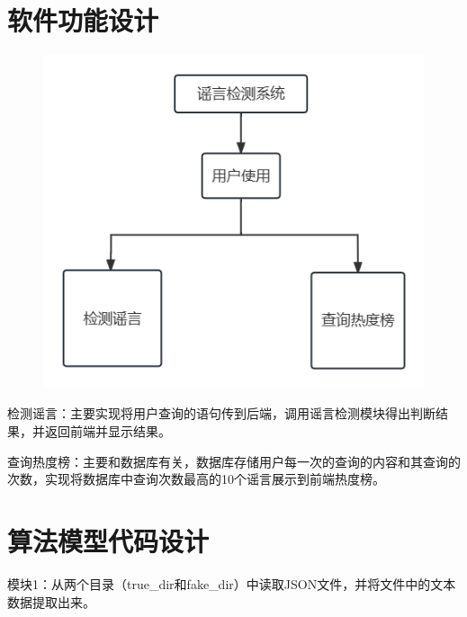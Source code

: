 \documentclass{article}
\begin{document}
\section{软件功能设计}
\begin{figure}[H]
    \centering
    \includegraphics[scale=0.6]{pircture/软件功能设计.png}
\end{figure}

检测谣言：主要实现将用户查询的语句传到后端，调用谣言检测模块得出判断结果，并返回前端并显示结果。

查询热度榜：主要和数据库有关，数据库存储用户每一次的查询的内容和其查询的次数，实现将数据库中查询次数最高的10个谣言展示到前端热度榜。

\newpage

\section{算法模型代码设计}
模块1：从两个目录（true\_dir和fake\_dir）中读取JSON文件，并将文件中的文本数据提取出来。
\end{document}
